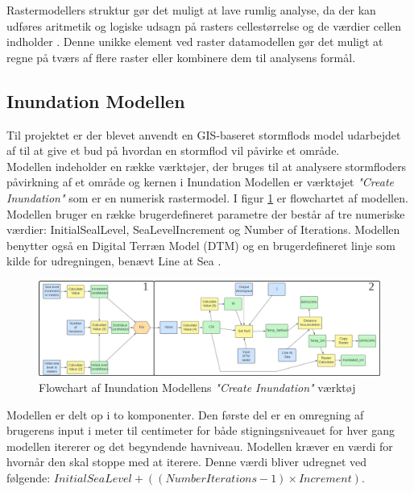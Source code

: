 Rastermodellers struktur gør det muligt at lave rumlig analyse, da der kan udføres aritmetik og logiske udsagn på rasters cellestørrelse og de værdier cellen indholder \citep{bolstad_gis_2022, longley_geographical_2008}. Denne unikke element ved raster datamodellen gør det muligt at regne på tværs af flere raster eller kombinere dem til analysens formål. 


\subsection{Inundation Modellen} \label{Afsnit: Inundation Model}

Til projektet er der blevet anvendt en GIS-baseret stormflods model udarbejdet af \cite{balstrom_kirby_inundation} til at give et bud på hvordan en stormflod vil påvirke et område. \\
Modellen indeholder en række værktøjer, der bruges til at analysere stormfloders påvirkning af et område og kernen i Inundation Modellen er værktøjet \textit{"Create Inundation"} som er en numerisk rastermodel. I figur \ref{Figur: Create Inundation} er flowchartet af modellen. Modellen bruger en række brugerdefineret parametre der består af tre numeriske værdier: InitialSealLevel, SeaLevelIncrement og Number of Iterations. Modellen benytter også en Digital Terræn Model (DTM) og en brugerdefineret linje som kilde for udregningen, benævt Line at Sea \citep{balstrom_kirby_inundation}. 

\begin{figure}[H]
    \centering
    \includegraphics[width=1\linewidth]{images/teori/inundation_model_separated.jpg}
    \caption{Flowchart af Inundation Modellens \textit{"Create Inundation"} værktøj}
    \label{Figur: Create Inundation}
\end{figure}

Modellen er delt op i to komponenter. Den første del er en omregning af brugerens input i meter til centimeter for både stigningsniveauet for hver gang modellen itererer og det begyndende havniveau. Modellen kræver en værdi for hvornår den skal stoppe med at iterere. Denne værdi bliver udregnet ved følgende: $InitialSeaLevel + ((NumberIterations - 1)\times Increment)$. \\


